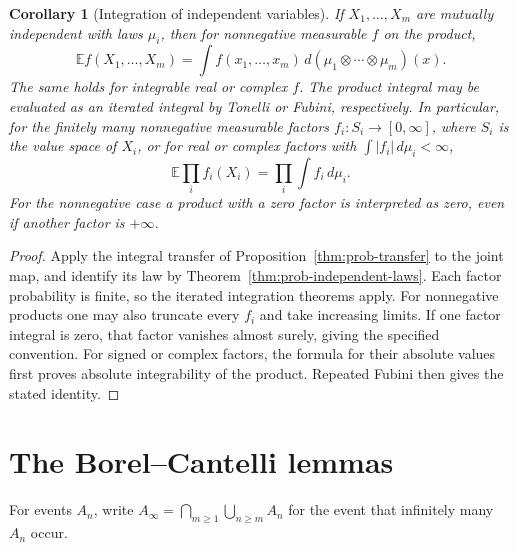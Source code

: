\documentclass[11pt,oneside,openany]{book}
\theoremstyle{plain}
\newtheorem{corollary}[theorem]{Corollary}
\theoremstyle{definition}
\theoremstyle{remark}
\begin{document}
\begin{corollary}[Integration of independent variables]
\label{thm:prob-factorization}
If \(X_1,\ldots,X_m\) are mutually independent with laws \(\mu_i\),
then for nonnegative measurable \(f\) on the product,
\[
 \mathbb E f(X_1,\ldots,X_m)=
 \int f(x_1,\ldots,x_m)\,d(\mu_1\otimes\cdots\otimes\mu_m)(x).
\]
The same holds for integrable real or complex \(f\). The product
integral may be evaluated as an iterated integral by Tonelli or
Fubini, respectively. In particular, for the finitely many
nonnegative measurable factors \(f_i\colon S_i\to[0,\infty]\),
where \(S_i\) is the value space of \(X_i\), or for real or complex factors with
\(\int |f_i|\,d\mu_i<\infty\),
\[
 \mathbb E\prod_i f_i(X_i)=\prod_i\int f_i\,d\mu_i .
\]
For the nonnegative case a product with a zero factor is interpreted
as zero, even if another factor is \(+\infty\).
\end{corollary}
\begin{proof}
Apply the integral transfer of Proposition~\ref{thm:prob-transfer}
to the joint map, and identify its law by
Theorem~\ref{thm:prob-independent-laws}. Each factor probability
is finite, so the iterated integration theorems apply. For
nonnegative products one may also truncate every \(f_i\) and take
increasing limits. If one factor integral is zero, that factor
vanishes almost surely, giving the specified convention. For signed
or complex factors, the formula for their absolute values first
proves absolute integrability of the product. Repeated Fubini then
gives the stated identity.
\end{proof}

\section{The Borel--Cantelli lemmas}
\label{p02-03}

For events \(A_n\), write \(A_\infty=\bigcap_{m\ge1}\bigcup_{n\ge m}A_n\)
for the event that infinitely many \(A_n\) occur.
\end{document}
